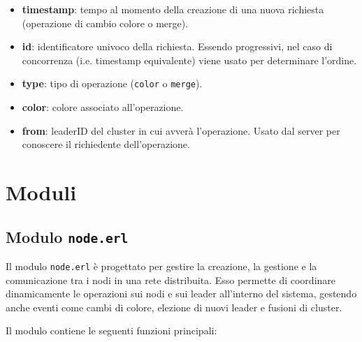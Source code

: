 \documentclass[12pt, a4paper]{report}
\begin{document}
\begin{itemize}
    \item \textbf{timestamp}: tempo al momento della creazione di una nuova richiesta (operazione di cambio colore o merge).
    \item \textbf{id}: identificatore univoco della richiesta. Essendo progressivi, nel caso di concorrenza (i.e. timestamp equivalente) viene usato per determinare l'ordine.
    \item \textbf{type}: tipo di operazione (\texttt{color} o \texttt{merge}).
    \item \textbf{color}: colore associato all'operazione.
    \item \textbf{from}: leaderID del cluster in cui avver\`a l'operazione. Usato dal server per conoscere il richiedente dell'operazione.
\end{itemize}

\section{Moduli}
\subsection{Modulo \texttt{node.erl}}

Il modulo \texttt{node.erl} è progettato per gestire la creazione, la gestione e la comunicazione tra i nodi in una rete distribuita. Esso permette di coordinare dinamicamente le operazioni sui nodi e sui leader all'interno del sistema, gestendo anche eventi come cambi di colore, elezione di nuovi leader e fusioni di cluster.

Il modulo contiene le seguenti funzioni principali:
\end{document}
